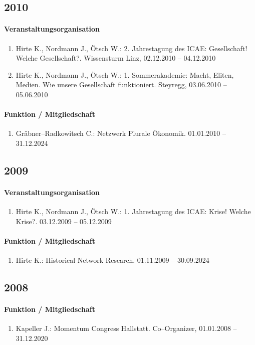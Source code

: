 \subsection*{2010}
\paragraph{Veranstaltungsorganisation}
\begin{enumerate}[leftmargin=*, labelsep=0.5cm]
\item Hirte K., Nordmann J., Ötsch W.: 2. Jahrestagung des ICAE: Gesellschaft! Welche Gesellschaft?. Wissensturm Linz, 02.12.2010 -- 04.12.2010
\item Hirte K., Nordmann J., Ötsch W.: 1. Sommerakademie: Macht, Eliten, Medien. Wie unsere Gesellschaft funktioniert. Steyregg, 03.06.2010 -- 05.06.2010
\end{enumerate}

\paragraph{Funktion / Mitgliedschaft}
\begin{enumerate}[leftmargin=*, labelsep=0.5cm]
\item Gräbner--Radkowitsch C.: Netzwerk Plurale Ökonomik. 01.01.2010 -- 31.12.2024
\end{enumerate}
\subsection*{2009}
\paragraph{Veranstaltungsorganisation}
\begin{enumerate}[leftmargin=*, labelsep=0.5cm]
\item Hirte K., Nordmann J., Ötsch W.: 1. Jahrestagung des ICAE: Krise! Welche Krise?. 03.12.2009 -- 05.12.2009
\end{enumerate}

\paragraph{Funktion / Mitgliedschaft}
\begin{enumerate}[leftmargin=*, labelsep=0.5cm]
\item Hirte K.: Historical Network Research. 01.11.2009 -- 30.09.2024
\end{enumerate}
\subsection*{2008}
\paragraph{Funktion / Mitgliedschaft}
\begin{enumerate}[leftmargin=*, labelsep=0.5cm]
\item Kapeller J.: Momentum Congress Hallstatt. Co--Organizer, 01.01.2008 -- 31.12.2020
\end{enumerate}